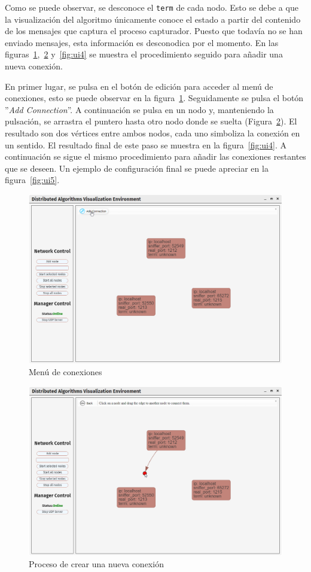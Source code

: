 Como se puede observar, se desconoce el \texttt{term} de cada nodo. Esto se debe a que la visualización del algoritmo únicamente conoce el estado a partir del contenido de los mensajes que captura el proceso capturador. Puesto que todavía no se han enviado mensajes, esta información es desconodica por el momento. En las figuras~\ref{fig:ui2},~\ref{fig:ui3} y~\ref{fig:ui4} se muestra el procedimiento seguido para añadir una nueva conexión.

En primer lugar, se pulsa en el botón de edición para acceder al menú de conexiones, esto se puede observar en la figura~\ref{fig:ui2}. Seguidamente se pulsa el botón ''\textit{Add Connection}''. A continuación se pulsa en un nodo y, manteniendo la pulsación, se arrastra el puntero hasta otro nodo donde se suelta (Figura~\ref{fig:ui3}). El resultado son dos vértices entre ambos nodos, cada uno simboliza la conexión en un sentido. El resultado final de este paso se muestra en la figura~\ref{fig:ui4}. A continuación se sigue el mismo procedimiento para añadir las conexiones restantes que se deseen. Un ejemplo de configuración final se puede apreciar en la figura~\ref{fig:ui5}.

\begin{figure}[!htb]
  \centering
  \includegraphics[width=0.9\linewidth]{imagenes/ui2}
  \caption{Menú de conexiones}
  \label{fig:ui2}
\end{figure}

\begin{figure}[!htb]
  \centering
  \includegraphics[width=0.9\linewidth]{imagenes/ui3}
  \caption{Proceso de crear una nueva conexión}
  \label{fig:ui3}
\end{figure}

